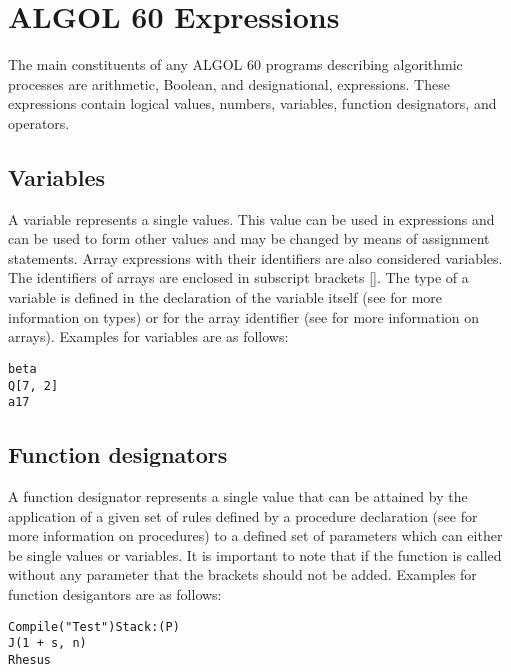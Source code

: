 \documentclass{article}
\begin{document}
\newpage

\section{ALGOL 60 Expressions}
The main constituents of any ALGOL 60 programs describing algorithmic processes are arithmetic, Boolean, and designational, expressions. These expressions contain logical values, numbers, variables, function designators, and operators.

\subsection{Variables}
A variable represents a single values. This value can be used in expressions and can be used to form other values and may be changed by means of assignment statements. Array expressions with their identifiers are also considered variables. The identifiers of arrays are enclosed in subscript brackets []. The type of a variable is defined in the declaration of the variable itself (see  for more information on types) or for the array identifier (see  for more information on arrays). Examples for variables are as follows:

\begin{lstlisting}[language={[60]algol}]
beta
Q[7, 2]
a17
\end{lstlisting}

\subsection{Function designators}
A function designator represents a single value that can be attained by the application of a given set of rules defined by a procedure declaration (see  for more information on procedures) to a defined set of parameters which can either be single values or variables. It is important to note that if the function is called without any parameter that the brackets should not be added. Examples for function desigantors are as follows:\\

\begin{lstlisting}[language={[60]algol}]
Compile("Test")Stack:(P)
J(1 + s, n)
Rhesus
\end{lstlisting}
\end{document}
